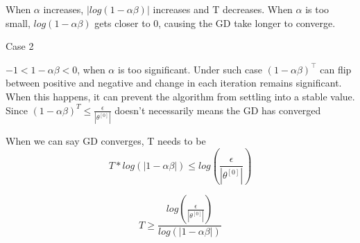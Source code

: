 \begin{answer}
When $\alpha$ increases, $|log(1- \alpha\beta)|$ increases and T decreases. 
When $\alpha$ is too small, $log(1 - \alpha\beta)$ gets closer to 0, causing the GD take longer to converge.

Case 2 

$ -1 < 1-\alpha\beta < 0$, when $\alpha$ is too significant. Under such case $(1 - \alpha\beta)^\top$ can flip between positive and negative and change in each iteration remains significant. When this happens,  it can prevent the algorithm from settling into a stable value. Since $(1 - \alpha \beta) ^ T \le \frac{\epsilon}{|\theta ^{[0]}|}$ doesn't necessarily means the GD has converged

When we can say GD converges, T needs to be 
\begin{equation*}
    T*log(|1- \alpha\beta|) \le log(\frac{\epsilon}{|\theta ^{[0]}|})
\end{equation*}

\begin{equation*}
	 T \ge \frac{log(\frac{\epsilon}{|\theta ^{[0]}|})}{log(|1- \alpha\beta|)} 
\end{equation*}

\end{answer}
